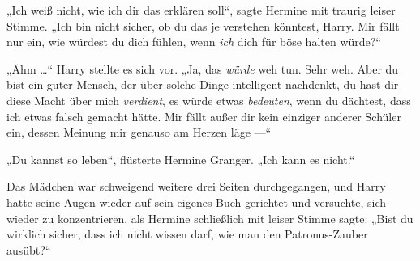 „Ich weiß nicht, wie ich dir das erklären soll“, sagte Hermine mit traurig leiser Stimme.
„Ich bin nicht sicher, ob du das je verstehen könntest, Harry. Mir fällt nur ein, wie würdest du dich fühlen, wenn \emph{ich} dich für böse halten würde?“

„Ähm …“ Harry stellte es sich vor.
„Ja, das \emph{würde} weh tun. Sehr weh. Aber du bist ein guter Mensch, der über solche Dinge intelligent nachdenkt, du hast dir diese Macht über mich \emph{verdient}, es würde etwas \emph{bedeuten}, wenn du dächtest, dass ich etwas falsch gemacht hätte. Mir fällt außer dir kein einziger anderer Schüler ein, dessen Meinung mir genauso am Herzen läge —“

„Du kannst so leben“, flüsterte Hermine Granger.
„Ich kann es nicht.“

Das Mädchen war schweigend weitere drei Seiten durchgegangen, und Harry hatte seine Augen wieder auf sein eigenes Buch gerichtet und versuchte, sich wieder zu konzentrieren, als Hermine schließlich mit leiser Stimme sagte:
„Bist du wirklich sicher, dass ich nicht wissen darf, wie man den Patronus-Zauber ausübt?“


